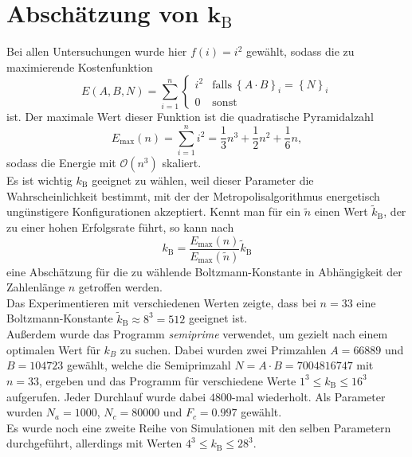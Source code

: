 \section{\texorpdfstring{Abschätzung von $\bm{k_\mathrm{B}}$}{Abschätzung von kB}}\label{sec:kbguess}
Bei allen Untersuchungen wurde hier $f\left(i\right)=i^2$ gewählt, sodass die zu maximierende Kostenfunktion
\begin{equation*}
		E\left(A,B,N\right)=\sum\limits_{i=1}^n\begin{cases}
    i^2 & \mathrm{falls}\:{\left\{A\cdot B\right\}}_i={\left\{N\right\}}_i \\
	0 & \mathrm{sonst}
  \end{cases}
\end{equation*}
ist. Der maximale Wert dieser Funktion ist die quadratische Pyramidalzahl~\parencite{oeis}
\begin{equation*}
		E_{\mathrm{\max}}\left(n\right)=\sum\limits_{i=1}^n i^2=\frac{1}{3}n^3+\frac{1}{2}n^2+\frac{1}{6}n,\label{eq:kbguess}
\end{equation*}
sodass die Energie mit $\mathcal{O}\left(n^3\right)$ skaliert. \\
Es ist wichtig $k_\mathrm{B}$ geeignet zu wählen, weil dieser Parameter die Wahrscheinlichkeit bestimmt, mit der der Metropolisalgorithmus energetisch ungünstigere Konfigurationen akzeptiert. Kennt man für ein $\tilde{n}$ einen Wert $\tilde{k}_\mathrm{B}$, der zu einer hohen Erfolgsrate  führt, so kann nach
\begin{equation*}
		k_\mathrm{B}=\frac{E_{\mathrm{\max}}\left(n\right)}{E_{\mathrm{\max}}\left(\tilde{n}\right)}\tilde{k}_\mathrm{B}
\end{equation*}
eine Abschätzung für die zu wählende Boltzmann-Konstante in Abhängigkeit der Zahlenlänge $n$ getroffen werden. \\
Das Experimentieren mit verschiedenen Werten zeigte, dass bei $n=33$ eine Boltzmann-Konstante $\tilde{k}_\mathrm{B}\approx 8^3=512$ geeignet ist. \\
Außerdem wurde das Programm \textit{semiprime} verwendet, um gezielt nach einem optimalen Wert für $k_B$ zu suchen. Dabei wurden zwei Primzahlen $A=66889$ und $B=104723$ gewählt, welche die Semiprimzahl $N=A\cdot B=7004816747$ mit $n=33$, ergeben und das Programm für verschiedene Werte $1^3\leq k_\mathrm{B}\leq 16^3$ aufgerufen. Jeder Durchlauf wurde dabei $4800$-mal wiederholt. Als Parameter wurden $N_a=1000$, $N_c=80000$ und $F_c=0.997$ gewählt. \\
Es wurde noch eine zweite Reihe von Simulationen mit den selben Parametern durchgeführt, allerdings mit Werten $4^3\leq k_\mathrm{B} \leq 28^3$.

